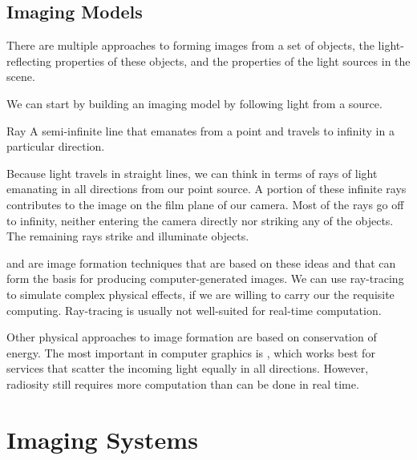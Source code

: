 \documentclass[\main/notes.tex]{subfiles}
\begin{document}
			\subsection{Imaging Models}
				There are multiple approaches to forming images from a set of objects,
				the light-reflecting properties of these objects, and
				the properties of the light sources in the scene.

				We can start by building an imaging model by following light from a source.

				\begin{definition}{Ray}
					A semi-infinite line that emanates from a point and
					travels to infinity in a particular direction.
				\end{definition}

				Because light travels in straight lines, we can think in terms of rays of light
				emanating in all directions from our point source.
				A portion of these infinite rays contributes to the image on the film plane of our camera.
				Most of the rays go off to infinity, neither entering the camera directly nor striking any
				of the objects.
				The remaining rays strike and illuminate objects.

				 and  are image formation techniques
				that are based on these ideas and that can form the basis for producing computer-generated
				images.
				We can use ray-tracing to simulate complex physical effects,
				if we are willing to carry our the requisite computing.
				Ray-tracing is usually not well-suited for real-time computation.

				Other physical approaches to image formation are based on conservation of energy.
				The most important in computer graphics is ,
				which works best for services that scatter the incoming light equally in all directions.
				However, radiosity still requires more computation than can be done in real time.

		\section{Imaging Systems}
\end{document}
